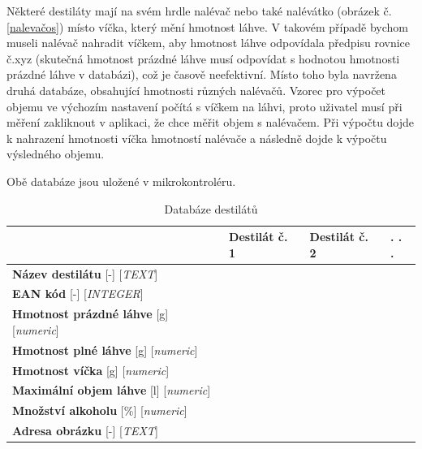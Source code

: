 
Některé destiláty mají na svém hrdle nalévač nebo také nalévátko (obrázek č. \ref{nalevačos}) místo víčka, který mění hmotnost láhve. V takovém případě bychom museli nalévač nahradit víčkem, aby hmotnost láhve odpovídala předpisu rovnice č.xyz (skutečná hmotnost prázdné láhve musí odpovídat s hodnotou hmotnosti prázdné láhve v databázi), což je časově neefektivní. Místo toho byla navržena druhá databáze, obsahující hmotnosti různých nalévačů. Vzorec pro výpočet objemu ve výchozím nastavení počítá s víčkem na láhvi, proto uživatel musí při měření zakliknout v aplikaci, že chce měřit objem s nalévačem. Při výpočtu dojde k nahrazení hmotnosti víčka hmotností nalévače a následně dojde k výpočtu výsledného objemu.



Obě databáze jsou uložené v mikrokontroléru.

\begin{table}[!h]
\centering
\begin{tabular}{|l|l|l|l|}
\hline
 & Destilát č. 1   & Destilát č. 2   &  . . . \\ \hline
\textbf{Název destilátu} [-] [\textit{TEXT}] &   &    &  \\ \hline
\textbf{EAN kód} [-] [\textit{INTEGER}]&  &    &        \\ \hline
\textbf{Hmotnost prázdné láhve} [g] [\textit{numeric}] &    &  &        \\ \hline
\textbf{Hmotnost plné láhve} [g] [\textit{numeric}] &    &    &  \\ \hline
\textbf{Hmotnost víčka} [g] [\textit{numeric}] &    &    &  \\ \hline
\textbf{Maximální objem láhve} [l] [\textit{numeric}] &    &    &  \\ \hline
\textbf{Množství alkoholu} [\%] [\textit{numeric}] &    &    &  \\ \hline
\textbf{Adresa obrázku} [-] [\textit{TEXT}] &    &    &  \\ \hline
\end{tabular}
\label{databaze_destilatu}
\caption{Databáze destilátů}
\end{table}


